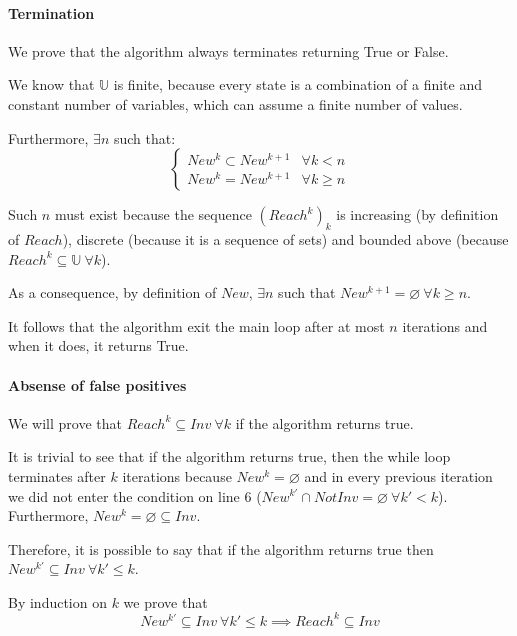 \documentclass[12pt]{article}
\begin{document}
    \paragraph{Termination}
    We prove that the algorithm always terminates returning True or False.
    
    We know that $\mathbb U$ is finite, because every state is a combination of a finite and constant number of variables, which can assume a finite number of values.

    Furthermore, $\exists n$ such that:
    $$
    \begin{cases}
          New^k \subset New^{k+1} & \forall k < n \\
          New^k = New^{k+1} & \forall k \geq n
    \end{cases}
    $$

    Such $n$ must exist because the sequence $(Reach^k)_k$ is increasing (by definition of $Reach$), discrete (because it is a sequence of sets) and bounded above (because $Reach^k \subseteq \mathbb U\ \forall k$).

    As a consequence, by definition of $New$, $\exists n$ such that $New^{k+1} = \varnothing\ \forall k \geq n$.

    It follows that the algorithm exit the main loop after at most $n$ iterations and when it does, it returns True.

    \paragraph{Absense of false positives}

    We will prove that $Reach^k \subseteq Inv\ \forall k$ if the algorithm returns true.

    It is trivial to see that if the algorithm returns true, then the while loop terminates after $k$ iterations because $New^k = \varnothing$ and in every previous iteration we did not enter the condition on line 6 ($New^{k'} \cap NotInv = \varnothing\ \forall k' < k$).
    Furthermore, $New^k = \varnothing \subseteq Inv$.

    Therefore, it is possible to say that if the algorithm returns true then $New^{k'} \subseteq Inv\ \forall k' \leq k$.

    By induction on $k$ we prove that
    \begin{equation}\label{th:true:tesi}
        New^{k'} \subseteq Inv\ \forall k' \leq k \implies Reach^k \subseteq Inv
    \end{equation}
    
\end{document}
